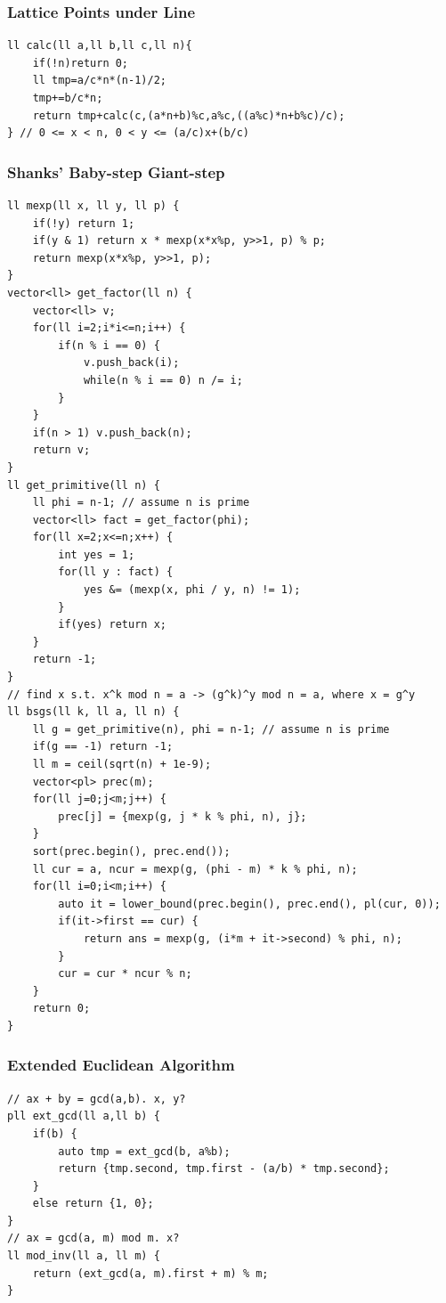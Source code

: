 \documentclass[landscape, 8pt, a4paper, oneside, twocolumn]{extarticle}
\begin{document}
\subsubsection{Lattice Points under Line}
\begin{verbatim}
ll calc(ll a,ll b,ll c,ll n){
    if(!n)return 0;
    ll tmp=a/c*n*(n-1)/2;
    tmp+=b/c*n;
    return tmp+calc(c,(a*n+b)%c,a%c,((a%c)*n+b%c)/c);
} // 0 <= x < n, 0 < y <= (a/c)x+(b/c)
\end{verbatim}
\subsubsection{Shanks' Baby-step Giant-step}
\begin{verbatim}
ll mexp(ll x, ll y, ll p) {
    if(!y) return 1;
    if(y & 1) return x * mexp(x*x%p, y>>1, p) % p;
    return mexp(x*x%p, y>>1, p);
}
vector<ll> get_factor(ll n) {
    vector<ll> v;
    for(ll i=2;i*i<=n;i++) {
        if(n % i == 0) {
            v.push_back(i);
            while(n % i == 0) n /= i;
        }
    }
    if(n > 1) v.push_back(n);
    return v;
}
ll get_primitive(ll n) {
    ll phi = n-1; // assume n is prime
    vector<ll> fact = get_factor(phi);
    for(ll x=2;x<=n;x++) {
        int yes = 1;
        for(ll y : fact) {
            yes &= (mexp(x, phi / y, n) != 1);
        }
        if(yes) return x;
    }
    return -1;
}
// find x s.t. x^k mod n = a -> (g^k)^y mod n = a, where x = g^y
ll bsgs(ll k, ll a, ll n) {
    ll g = get_primitive(n), phi = n-1; // assume n is prime
    if(g == -1) return -1;
    ll m = ceil(sqrt(n) + 1e-9);
    vector<pl> prec(m);
    for(ll j=0;j<m;j++) {
        prec[j] = {mexp(g, j * k % phi, n), j};
    }
    sort(prec.begin(), prec.end());
    ll cur = a, ncur = mexp(g, (phi - m) * k % phi, n);
    for(ll i=0;i<m;i++) {
        auto it = lower_bound(prec.begin(), prec.end(), pl(cur, 0));
        if(it->first == cur) {
            return ans = mexp(g, (i*m + it->second) % phi, n);
        }
        cur = cur * ncur % n;
    }
    return 0;
}
\end{verbatim}
\subsubsection{Extended Euclidean Algorithm}
\begin{verbatim}
// ax + by = gcd(a,b). x, y?
pll ext_gcd(ll a,ll b) {
    if(b) {
        auto tmp = ext_gcd(b, a%b);
        return {tmp.second, tmp.first - (a/b) * tmp.second};
    }
    else return {1, 0};
}
// ax = gcd(a, m) mod m. x?
ll mod_inv(ll a, ll m) {
    return (ext_gcd(a, m).first + m) % m;
}
\end{verbatim}
\end{document}
